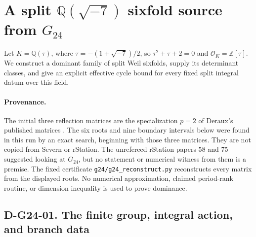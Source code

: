 \section{A split \(\mathbb Q(\sqrt{-7})\) sixfold source from \(G_{24}\)}
\label{sec:g24-new}

Let \(K=\mathbb Q(\tau)\), where
\(\tau=-(1+\sqrt{-7})/2\), so \(\tau^2+\tau+2=0\) and
\(\mathcal O_K=\mathbb Z[\tau]\).  We construct a dominant family of split
Weil sixfolds, supply its determinant classes, and give an explicit effective
cycle bound for every fixed split integral datum over this field.

\paragraph{Provenance.}
The initial three reflection matrices are the specialization \(p=2\) of
Deraux's published matrices \cite[equation (13), author manuscript p.~24;
\S3, pp.~4--6]{G24:Deraux}.  The six roots and nine boundary intervals below
were found in this run by an exact search, beginning with those three matrices.
They are not copied from Severn or rStation.  The unrefereed rStation papers
58 and 75 suggested looking at \(G_{24}\), but no statement or numerical
witness from them is a premise.  The fixed certificate
\texttt{g24/g24\_reconstruct.py} reconstructs every matrix from the displayed
roots.  No numerical approximation, claimed period-rank routine, or dimension
inequality is used to prove dominance.

\subsection*{D-G24-01. The finite group, integral action, and branch data}

